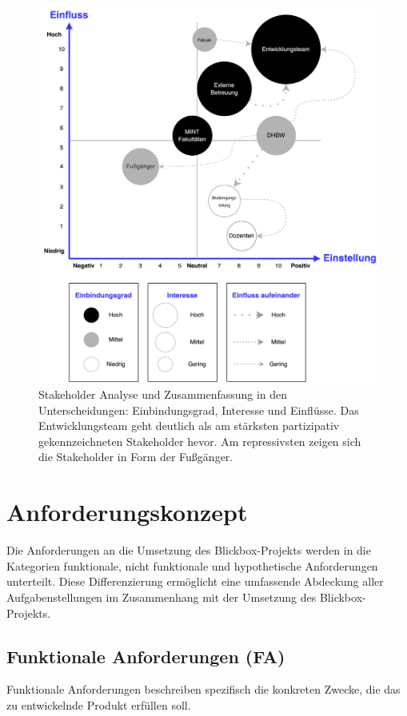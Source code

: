 \documentclass[
]{article}
\begin{document}
\begin{figure}
  \centering
  \includegraphics[width=1\textwidth]{./resources/stakeholderanalyse.drawio.png}
  \caption{Stakeholder Analyse und Zusammenfassung in den Unterscheidungen: Einbindungsgrad, Interesse und Einflüsse. Das Entwicklungsteam geht deutlich als am stärksten partizipativ gekennzeichneten Stakeholder hevor. Am repressivsten zeigen sich die Stakeholder in Form der Fußgänger.}
  \label{fig:deine_label}
\end{figure}

\section{Anforderungskonzept}
Die Anforderungen an die Umsetzung des Blickbox-Projekts werden in die Kategorien funktionale, nicht funktionale und hypothetische Anforderungen unterteilt.
Diese Differenzierung ermöglicht eine umfassende Abdeckung aller Aufgabenstellungen im
Zusammenhang mit der Umsetzung des Blickbox-Projekts.

\subsection{Funktionale Anforderungen (FA)}
  Funktionale Anforderungen beschreiben spezifisch die konkreten Zwecke, die das zu entwickelnde Produkt erfüllen soll.
\end{document}
